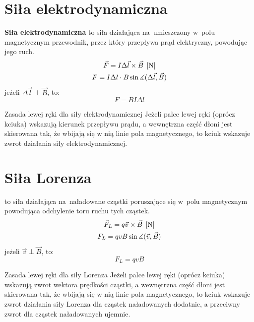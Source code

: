   \section{Siła elektrodynamiczna}
    \begin{definition}
      \textbf{Siła elektrodynamiczna} to siła działająca na~umieszczony w~polu magnetycznym przewodnik, przez który przepływa prąd elektryczny, powodując jego ruch.
      \begin{gather*}
          \vec F = I\Delta\vec l\times\vec B \;\left[\mathrm{N}\right]\\
          F = I\Delta l\cdot B\sin\measuredangle(\Delta\vec l, \vec B)
      \end{gather*}
      jeżeli $\Delta\vec l \perp \vec B$, to:
      \begin{equation}
        \boxed{F = BI\Delta l}
      \end{equation}
    \end{definition}
    \begin{law}{Zasada lewej ręki dla siły elektrodynamicznej}
      Jeżeli palce lewej ręki (oprócz kciuka) wskazują kierunek przepływu prądu, a wewnętrzna część dłoni jest skierowana tak, że wbijają się w nią linie pola magnetycznego, to kciuk wskazuje zwrot działania siły elektrodynamicznej.
    \end{law}

  \section{Siła Lorenza}
    \begin{definition}
       to siła działająca na~naładowane cząstki poruszające się w~polu magnetycznym powodująca odchylenie toru ruchu tych cząstek.
    \begin{gather*}
      \vec F_L = q\vec v\times\vec B \;\left[\mathrm{N}\right]\\
      F_L = qvB\sin\measuredangle(\vec v, \vec B)
    \end{gather*}
    jeżeli $\vec v\perp\vec B$, to:
    \begin{equation}
      \boxed{F_L = qvB}
    \end{equation}
    \end{definition}
    \begin{law}{Zasada lewej ręki dla siły Lorenza}
      Jeżeli palce lewej ręki (oprócz kciuka) wskazują zwrot wektora prędkości cząstki, a wewnętrzna część dłoni jest skierowana tak, że wbijają się w nią linie pola magnetycznego, to kciuk wskazuje zwrot działania siły Lorenza dla cząstek naładowanych dodatnie, a przeciwny zwrot dla cząstek naładowanych ujemnie.
    \end{law}

